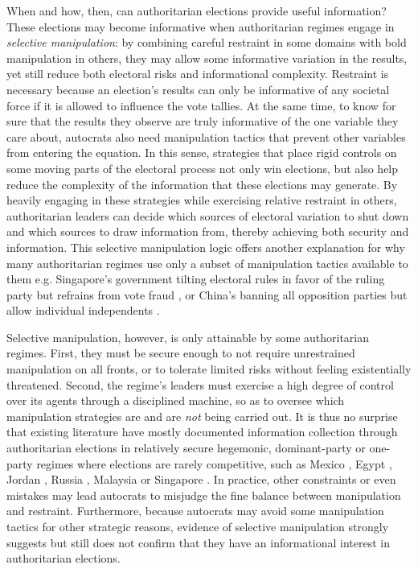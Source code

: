 \documentclass[12pt]{article}
\newcommand{\1}{\mathbbm{1}}
\begin{document}
When and how, then, can authoritarian elections provide useful information? These elections may become informative when authoritarian regimes engage in \textit{selective manipulation}: by combining careful restraint in some domains with bold manipulation in others, they may allow some informative variation in the results, yet still reduce both electoral risks and informational complexity. Restraint is necessary because an election's results can only be informative of any societal force if it is allowed to influence the vote tallies. At the same time, to know for sure that the results they observe are truly informative of the one variable they care about, autocrats also need manipulation tactics that prevent other variables from entering the equation. In this sense, strategies that place rigid controls on some moving parts of the electoral process not only win elections, but also help reduce the complexity of the information that these elections may generate. By heavily engaging in these strategies while exercising relative restraint in others, authoritarian leaders can decide which sources of electoral variation to shut down and which sources to draw information from, thereby achieving both security and information. This selective manipulation logic offers another explanation for why many authoritarian regimes use only a subset of manipulation tactics available to them e.g. Singapore's government tilting electoral rules in favor of the ruling party but refrains from vote fraud \citep{Tan2013}, or China's banning all opposition parties but allow individual independents \citep[see][]{Junzhi2010}.

Selective manipulation, however, is only attainable by some authoritarian regimes. First, they must be secure enough to not require unrestrained manipulation on all fronts, or to tolerate limited risks without feeling existentially threatened. Second, the regime's leaders must exercise a high degree of control over its agents through a disciplined machine, so as to oversee which manipulation strategies are and are \textit{not} being carried out. It is thus no surprise that existing literature have mostly documented information collection through authoritarian elections in relatively secure hegemonic, dominant-party or one-party regimes where elections are rarely competitive, such as Mexico \citep{Magaloni2006}, Egypt \citep{Blaydes2010}, Jordan \citep{LustOkar2005}, Russia \citep{Myagkov2009, RundlettSvolik2016}, Malaysia \citep{Brownlee2007} or Singapore \citep{Miller2015}. In practice, other constraints or even mistakes may lead autocrats to misjudge the fine balance between manipulation and restraint. Furthermore, because autocrats may avoid some manipulation tactics for other strategic reasons, evidence of selective manipulation strongly suggests but still does not confirm that they have an informational interest in authoritarian elections.
\end{document}

